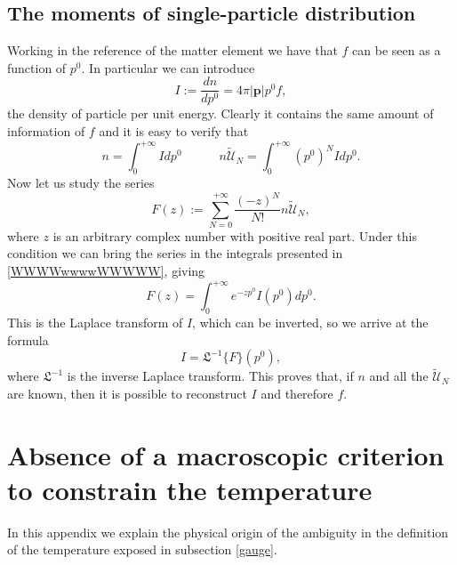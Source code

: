 \documentclass[useAMS,usenatbib,prd,twocolumn,nofootinbib]{revtex4-1}
\newcommand{\vect}[1]{\mathbf{{#1}}}
\newcommand{\spc}{\quad \quad \quad}
\begin{document}
\subsection{The moments of single-particle distribution}\label{TMOSPD}

Working in the reference of the matter element we have that $f$ can be seen as a function of $p^0$. In particular we can introduce
\begin{equation}
I :=\dfrac{dn}{dp^0} =4\pi |\vect{p}| p^0 f ,
\end{equation}
the density of particle per unit energy. Clearly it contains the same amount of information of $f$ and it is easy to verify that
\begin{equation}\label{WWWWwwwwWWWWW}
 n = \int_0^{+\infty} I d p^0 \spc
 n\tilde{\mathcal{U}}_N = \int_0^{+\infty} (p^0)^N I d p^0. 
\end{equation}
Now let us study the series
\begin{equation}
F(z) := \sum_{N=0}^{+\infty} \dfrac{(-z)^N}{N!} n\tilde{\mathcal{U}}_N,
\end{equation}
where $z$ is an arbitrary complex number with positive real part. Under this condition we can bring the series in the integrals presented in \eqref{WWWWwwwwWWWWW}, giving
\begin{equation}
F(z) = \int_0^{+\infty} e^{-zp^0} I(p^0) d p^0.
\end{equation}
This is the Laplace transform of $I$, which can be inverted, so we arrive at the formula
\begin{equation}
I = \mathfrak{L}^{-1}\{ F \} (p^0),
\end{equation}
where $\mathfrak{L}^{-1}$ is the inverse Laplace transform. This proves that, if $n$ and all the $\tilde{\mathcal{U}}_N$ are known, then it is possible to reconstruct $I$ and therefore $f$.


\section{Absence of a macroscopic criterion to constrain the temperature}\label{statmec}

In this appendix we explain the physical origin of the ambiguity in the definition of the temperature exposed in subsection \ref{gauge}.
\end{document}

